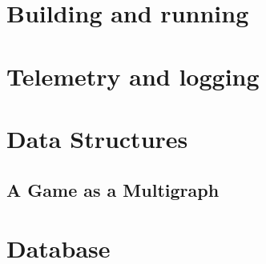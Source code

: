 \documentclass{article}
\begin{document}
\section{Building and running}
\section{Telemetry and logging}
\section{Data Structures}
\subsection{A Game as a Multigraph}

\section{Database}
\end{document}
